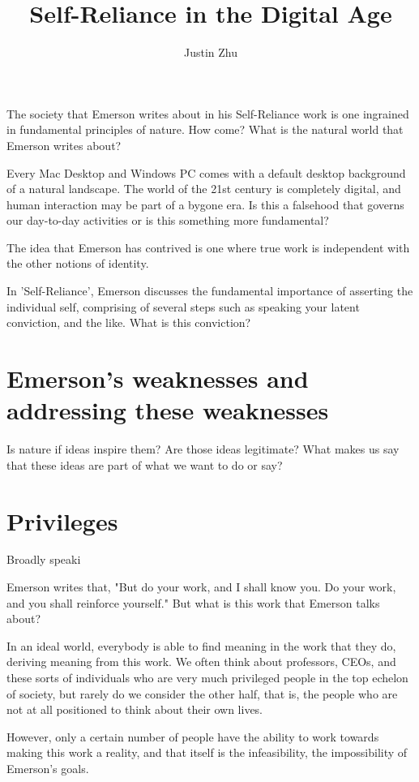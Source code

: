 \documentclass[12pt,letterpaper]{article}
\author{Justin Zhu}
\title{Self-Reliance in the Digital Age}
\begin{document}
\maketitle

The society that Emerson writes about in his Self-Reliance work is one ingrained in fundamental principles of nature. How come?  What is the natural world that Emerson writes about?

Every Mac Desktop and Windows PC comes with a default desktop background of a natural landscape.  The world of the 21st century is completely digital, and human interaction may be part of a bygone era.  Is this a falsehood that governs our day-to-day activities or is this something more fundamental?

The idea that Emerson has contrived is one where true work is independent with the other notions of identity. 

In 'Self-Reliance', Emerson discusses the fundamental
importance of asserting the individual self, comprising of
several steps such as speaking your latent conviction, and
the like.  What is this conviction?

\section{Emerson's weaknesses and addressing these weaknesses}

Is nature if ideas inspire them?  Are those ideas legitimate?  What makes us say that these ideas are part of what we want to do or say?


\section{Privileges}
Broadly speaki

Emerson writes that, "But do your work, and I shall know you. Do your work, and you shall reinforce yourself."  But what is this work that Emerson talks about?
  
In an ideal world, everybody is able to find meaning in the
work that they do, deriving meaning from this work.
We often think about professors, CEOs, and these sorts of
individuals who are very much privileged people in the top
echelon of society, but rarely do we consider the other
half, that is, the people who are not at all positioned to think about their own lives.

However, only a certain number of people have the ability to
work towards making this work a reality, and that itself is
the infeasibility, the impossibility of Emerson's goals.
\end{document}

